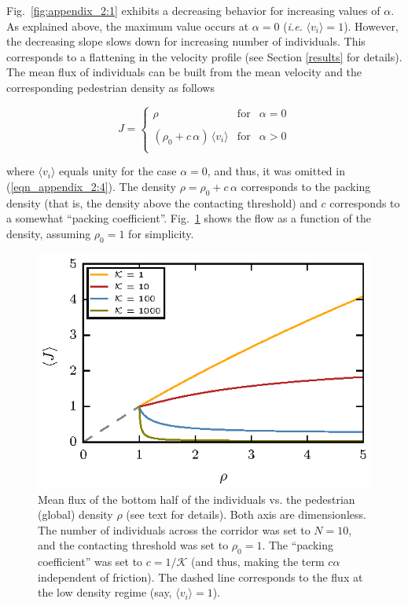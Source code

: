 \documentclass[preprint,12pt]{elsarticle}
\begin{document}
Fig.~\ref{fig:appendix_2:1} exhibits a decreasing behavior for increasing 
values of $\alpha$. As explained above, the maximum value occurs at $\alpha=0$ 
(\textit{i.e.} $\langle v_i\rangle=1$). However, the decreasing slope slows 
down for increasing number of individuals. This corresponds to a flattening in 
the velocity profile (see Section \ref{results} for details).  \\

The mean flux of individuals can be built from the mean velocity and the 
corresponding pedestrian density as follows

\begin{equation}
 J=\left\{\begin{array}{lcl}
          \rho & \mathrm{for} & \alpha=0 \\
          & & \\
          (\rho_0+c\,\alpha)\,\langle v_i\rangle & \mathrm{for}  & 
\alpha>0\\
         \end{array}\right.\label{eqn_appendix_2:4}
\end{equation}

where $\langle v_i\rangle$ equals unity for the case $\alpha=0$, and thus, it 
was omitted in (\ref{eqn_appendix_2:4}). The density $\rho=\rho_0+c\,\alpha$ 
corresponds to the packing density (that is, the density above the contacting 
threshold) and $c$ corresponds to a somewhat ``packing coefficient''. 
Fig.~\ref{fig:appendix_2:2} shows the flow as a function of the density, 
assuming $\rho_0=1$ for simplicity. \\


\begin{figure}[htbp!]
\centering
\includegraphics[width=0.7\columnwidth]
{./fig_flux_model.eps}
\caption{\label{fig:appendix_2:2} Mean flux of the bottom half of the 
individuals vs. the pedestrian (global) density $\rho$ (see text for details). 
Both axis are dimensionless. The number of individuals across the 
corridor was set to $N=10$, and the contacting threshold was set to $\rho_0=1$. 
The ``packing coefficient'' was set to $c=1/\mathcal{K}$ (and thus, making the 
term $c\alpha$ independent of friction). The dashed line corresponds to the 
flux at the low density regime (say, $\langle v_i\rangle=1$).   }
\end{figure}
\end{document}
